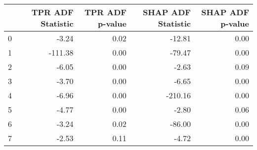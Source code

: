 \begin{tabular}{lrrrr}
\toprule
 & TPR ADF Statistic & TPR ADF p-value & SHAP ADF Statistic & SHAP ADF p-value \\
\midrule
0 & -3.24 & 0.02 & -12.81 & 0.00 \\
1 & -111.38 & 0.00 & -79.47 & 0.00 \\
2 & -6.05 & 0.00 & -2.63 & 0.09 \\
3 & -3.70 & 0.00 & -6.65 & 0.00 \\
4 & -6.96 & 0.00 & -210.16 & 0.00 \\
5 & -4.77 & 0.00 & -2.80 & 0.06 \\
6 & -3.24 & 0.02 & -86.00 & 0.00 \\
7 & -2.53 & 0.11 & -4.72 & 0.00 \\
\bottomrule
\end{tabular}
